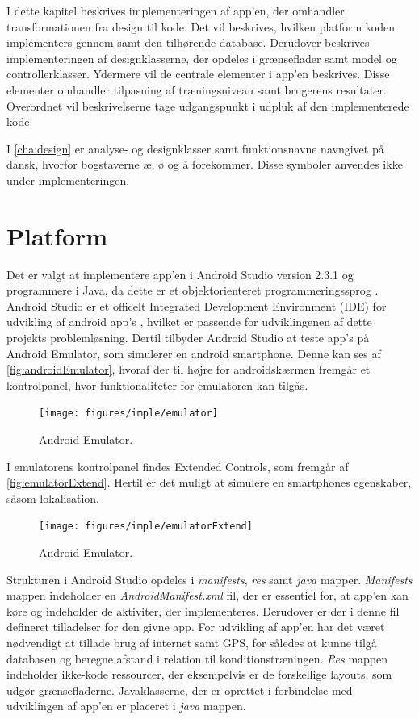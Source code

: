 I dette kapitel beskrives implementeringen af app'en, der omhandler transformationen fra design til kode. Det vil beskrives, hvilken platform koden implementers gennem samt den tilhørende database. Derudover beskrives implementeringen af designklasserne, der opdeles i grænseflader samt model og controllerklasser. Ydermere vil de centrale elementer i app'en beskrives. Disse elementer omhandler tilpasning af træningsniveau samt brugerens resultater. Overordnet vil beskrivelserne tage udgangspunkt i udpluk af den implementerede kode.

I \autoref{cha:design} er analyse- og designklasser samt funktionsnavne navngivet på dansk, hvorfor bogstaverne æ, ø og å forekommer. Disse symboler anvendes ikke under implementeringen.

\section{Platform}
Det er valgt at implementere app'en i Android Studio version 2.3.1 og programmere i Java, da dette er et objektorienteret programmeringssprog \cite{Brahma2015}. Android Studio er et officelt Integrated Development Environment (IDE) for udvikling af android app's \cite{android2017}, hvilket er passende for udviklingenen af dette projekts problemløsning. Dertil tilbyder Android Studio at teste app's på Android Emulator, som simulerer en android smartphone. Denne kan ses af \autoref{fig:androidEmulator}, hvoraf der til højre for androidskærmen fremgår et kontrolpanel, hvor funktionaliteter for emulatoren kan tilgås. 

\begin{figure} [H]
\centering
\texttt{[image: figures/imple/emulator]}
\caption{Android Emulator.}
\label{fig:androidEmulator}
\end{figure}

\noindent
I emulatorens kontrolpanel findes Extended Controls, som fremgår af \autoref{fig:emulatorExtend}. Hertil er det muligt at simulere en smartphones egenskaber, såsom lokalisation.

\begin{figure} [H]
\centering
\texttt{[image: figures/imple/emulatorExtend]}
\caption{Android Emulator.}
\label{fig:emulatorExtend}
\end{figure}

\noindent
Strukturen i Android Studio opdeles i \textit{manifests}, \textit{res} samt \textit{java} mapper. \textit{Manifests} mappen indeholder en \textit{AndroidManifest.xml} fil, der er essentiel for, at app'en kan køre og indeholder de aktiviter, der implementeres. Derudover er der i denne fil defineret tilladelser for den givne app. For udvikling af app'en har det været nødvendigt at tillade brug af internet samt GPS, for således at kunne tilgå databasen og beregne afstand i relation til konditionstræningen. 
\textit{Res} mappen indeholder ikke-kode ressourcer, der eksempelvis er de forskellige layouts, som udgør grænsefladerne.
Javaklasserne, der er oprettet i forbindelse med udviklingen af app'en er placeret i \textit{java} mappen.\cite{android2017}
 
